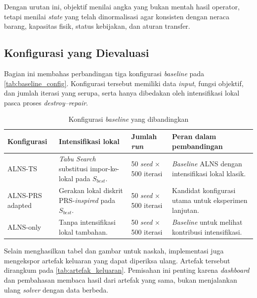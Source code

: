 \documentclass{file/TA-ITS}
\theoremstyle{definition}
\theoremstyle{definition}
\theoremstyle{plain}
\begin{document}
\noindent Dengan urutan ini, objektif menilai angka yang bukan mentah hasil operator, tetapi menilai \textit{state} yang telah dinormalisasi agar konsisten dengan neraca barang, kapasitas fisik, status kebijakan, dan aturan transfer.

\subsection{Konfigurasi yang Dievaluasi}
Bagian ini membahas perbandingan tiga konfigurasi \textit{baseline} pada \ref{tab:baseline_config}. Konfigurasi tersebut memiliki data \textit{input}, fungsi objektif, dan jumlah iterasi yang serupa, serta hanya dibedakan oleh intensifikasi lokal pasca proses \textit{destroy--repair}.

\begin{table}[H]
\centering
\caption{Konfigurasi \textit{baseline} yang dibandingkan}
\label{tab:config_compared_bab4}
\small
\begin{tabularx}{\textwidth}{@{}p{}p{}p{}X@{}}
\toprule
\textbf{Konfigurasi} & \textbf{Intensifikasi lokal} & \textbf{Jumlah \textit{run}} & \textbf{Peran dalam pembandingan} \\
\midrule
ALNS-TS & \textit{Tabu Search} substitusi impor-ke-lokal pada $S_{best}$. & 50 \textit{seed} $\times$ 500 iterasi & \textit{Baseline} ALNS dengan intensifikasi lokal klasik. \\
ALNS-PRS adapted & Gerakan lokal diskrit PRS-\textit{inspired} pada $S_{best}$. & 50 \textit{seed} $\times$ 500 iterasi & Kandidat konfigurasi utama untuk eksperimen lanjutan. \\
ALNS-only & Tanpa intensifikasi lokal tambahan. & 50 \textit{seed} $\times$ 500 iterasi & \textit{Baseline} untuk melihat kontribusi intensifikasi. \\
\bottomrule
\end{tabularx}
\end{table}

\noindent Selain menghasilkan tabel dan gambar untuk naskah, implementasi juga mengekspor artefak keluaran yang dapat diperiksa ulang. Artefak tersebut dirangkum pada \ref{tab:artefak_keluaran}. Pemisahan ini penting karena \textit{dashboard} dan pembahasan membaca hasil dari artefak yang sama, bukan menjalankan ulang \textit{solver} dengan data berbeda.
\end{document}
